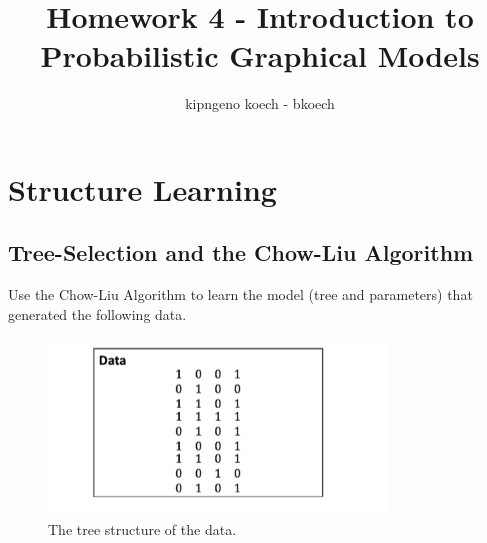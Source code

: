 \documentclass[a3paper,12pt]{extarticle} %
\begin{document}
\author{kipngeno koech - bkoech}
\title{Homework 4 - Introduction to Probabilistic Graphical Models}   
\maketitle

\medskip

\maketitle

\section{Structure Learning}
\subsection{Tree-Selection and the Chow-Liu Algorithm}
Use the Chow-Liu Algorithm to learn the model (tree and parameters) that generated the following data.

\begin{figure}[H]
\centering
\includegraphics[width=0.8\textwidth]{q1.png}
\caption{The tree structure of the data.}
\label{fig:tree}
\end{figure}
\end{document}
